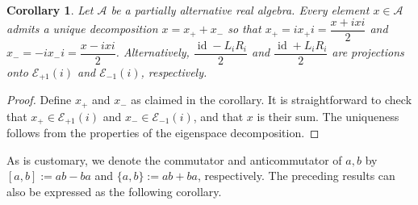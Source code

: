 \documentclass{amsart}
\theoremstyle{definition}
\newtheorem{remark}{Remark}
\theoremstyle{plain}
\newtheorem{corollary}{Corollary}
\begin{document}
\begin{corollary}
Let $\mathcal{A}$ be a partially alternative real algebra. Every element $x\in\mathcal{A}$ admits a unique decomposition $x=x_+ +x_-$ so that $x_+=ix_+i=\dfrac{x+ixi}{2}$ and $x_-=-ix_-i=\dfrac{x-ixi}{2}$. Alternatively, $\dfrac{\operatorname{id}-L_iR_i}{2}$ and $\dfrac{\operatorname{id}+L_iR_i}{2}$ are projections onto $\mathcal{E}_{+1}(i)$ and $\mathcal{E}_{-1}(i)$, respectively.
\end{corollary}
\begin{proof}
Define $x_+$ and $x_-$ as claimed in the corollary. It is straightforward to check that $x_+\in\mathcal{E}_{+1}(i)$ and $x_-\in\mathcal{E}_{-1}(i)$, and that $x$ is their sum. The uniqueness follows from the properties of the eigenspace decomposition.
\end{proof}



As is customary, we denote the commutator and anticommutator of $a,b$ by $[a,b]:=ab-ba$ and $\{a,b\}:=ab+ba$, respectively. The preceding results can also be expressed as the following corollary.
\end{document}
